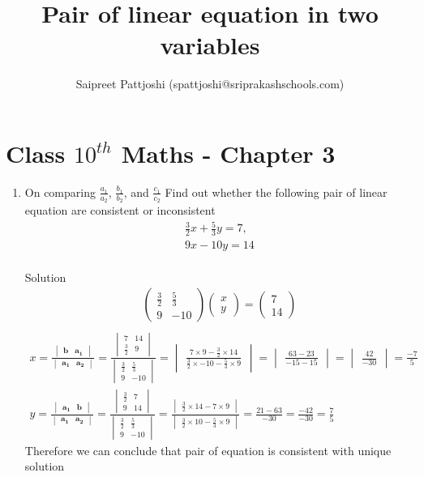\documentclass[12pt]{article}
\title{Pair of linear equation in two variables}
\author{Saipreet Pattjoshi (spattjoshi@sriprakashschools.com)}
\newcommand{\myvec}[1]{\ensuremath{\begin{pmatrix}#1\end{pmatrix}}}
\newcommand{\mydet}[1]{\ensuremath{\begin{vmatrix}#1\end{vmatrix}}}
\let\vec\mathbf
\begin{document}
\maketitle
\section*{Class $10^{th}$ Maths - Chapter 3}
\begin{enumerate}
\item On comparing $\frac{a_1}{a_2}$, $\frac{b_1}{b_2}$, and $\frac{c_1}{c_2} $
Find out whether the following pair of linear equation are consistent or inconsistent\\
\begin{align}
 \frac{3}{2}x + \frac{5}{3}y=7,\\
9x-10y=14
 \end{align}
\\
Solution
\begin{align}
 \myvec{ \frac{3}{2} & \frac{5}{3} \\ 9 &-10}
\myvec{x\\y}
=\myvec{7\\14}\\
\end{align}
\begin{align}
x=\frac{\mydet{\vec{b} & \vec{a_1}}}{\mydet{\vec{a_1} & \vec{a_2}}}=\frac{ \mydet{7&14\\ \frac{3}{2}&9}}{\mydet{\frac{3}{2}&\frac{5}{3}\\ 9&-10}}
=\mydet{\frac{7\times9 - \frac{3}{2} \times14}{\frac{3}{2}\times-10-\frac{5}{3}\times9}}
= \mydet{\frac{63-23}{-15-15}}
= \mydet{\frac{42}{-30}}
= {\frac{-7}{5}}
\\y= \frac{\mydet{\vec{a_1} & \vec{b}}}{\mydet{\vec{a_1}&\vec{a_2}}}
= \frac{\mydet{\frac{3}{2}&7\\9&14}}{\mydet{\frac{3}{2}&\frac{5}{3}\\9&-10}}= \frac{\mydet{\frac{3}{2}\times14 - 7\times9}}{\mydet{\frac{3}{2}\times10 -\frac{5}{3}\times9} }= \frac{21-63}{-30}
= \frac{-42}{-30}= \frac{7}{5}
\end{align}
Therefore we can conclude that pair of equation is consistent with unique solution
\end{enumerate}
\end{document}

